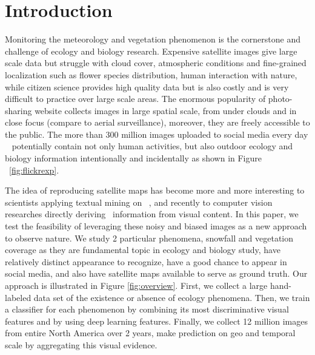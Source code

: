 \section{Introduction}

Monitoring the meteorology and vegetation phenomenon is the cornerstone and challenge of ecology and biology research. Expensive satellite images give large scale data but struggle with cloud cover, 
atmospheric conditions and fine-grained localization such as flower species distribution, human interaction with nature,
while citizen science provides high quality data but is also costly and is very difficult to practice over large scale areas.
The enormous popularity of photo-sharing website collects images in large spatial scale, from under clouds and in close focus (compare to aerial surveillance), 
moreover, they are freely accessible to the public.
The more than 300 million images uploaded to social media every day ~\cite{facebookstatistics}
 potentially contain not only human activities, but also outdoor ecology and biology 
information intentionally and incidentally as shown in Figure ~\ref{fig:flickrexp}.

The idea of reproducing satellite maps has become more and more interesting to scientists applying textual mining on~\cite{bollen11twitter,ecology2012www,you2015multifacetedelections,wood2013usingtourism} , 
and recently to computer vision researches directly deriving~\cite{murdock}  information from visual content.
In this paper, we test the feasibility of leveraging these noisy and biased images as a new approach to observe nature. We study 2 particular phenomena, snowfall and vegetation coverage as they are fundamental topic in ecology and biology study, have relatively distinct appearance to recognize, have a good chance to appear in social media, and also have satellite maps available to serve as ground truth. Our approach is illustrated in Figure \ref{fig:overview}. 
First, we collect a large hand-labeled data set of the existence or absence of ecology phenomena. 
Then, we train a classifier for each phenomenon by combining its most discriminative visual features and by using deep learning features. 
Finally, we collect 12 million images from entire North America over 2 years, make prediction on geo and temporal scale by aggregating this visual evidence.

